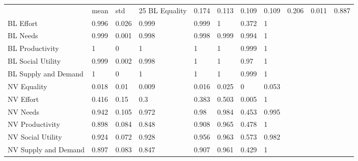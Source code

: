 \begin{tabular}{llllllll}
\toprule
 & mean & std & 25%
\midrule
BL Equality & 0.174 & 0.113 & 0.109 & 0.109 & 0.206 & 0.011 & 0.887 \\
BL Effort & 0.996 & 0.026 & 0.999 & 0.999 & 1 & 0.372 & 1 \\
BL Needs & 0.999 & 0.001 & 0.998 & 0.998 & 0.999 & 0.994 & 1 \\
BL Productivity & 1 & 0 & 1 & 1 & 1 & 0.999 & 1 \\
BL Social Utility & 0.999 & 0.002 & 0.998 & 1 & 1 & 0.97 & 1 \\
BL Supply and Demand & 1 & 0 & 1 & 1 & 1 & 0.999 & 1 \\
NV Equality & 0.018 & 0.01 & 0.009 & 0.016 & 0.025 & 0 & 0.053 \\
NV Effort & 0.416 & 0.15 & 0.3 & 0.383 & 0.503 & 0.005 & 1 \\
NV Needs & 0.942 & 0.105 & 0.972 & 0.98 & 0.984 & 0.453 & 0.995 \\
NV Productivity & 0.898 & 0.084 & 0.848 & 0.908 & 0.965 & 0.478 & 1 \\
NV Social Utility & 0.924 & 0.072 & 0.928 & 0.956 & 0.963 & 0.573 & 0.982 \\
NV Supply and Demand & 0.897 & 0.083 & 0.847 & 0.907 & 0.961 & 0.429 & 1 \\
\bottomrule
\end{tabular}
